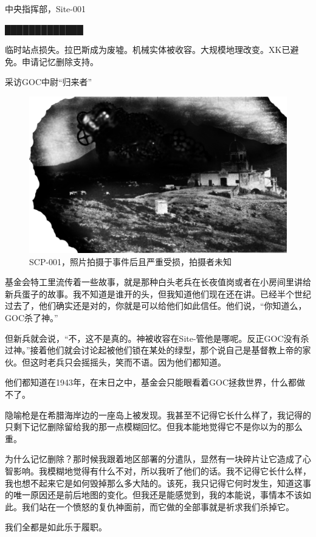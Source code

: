 \begin{scpbox}

中央指挥部，Site-001

█████████████

临时站点损失。拉巴斯成为废墟。机械实体被收容。大规模地理改变。XK已避免。申请记忆删除支持。

\end{scpbox}

采访GOC中尉“归来者” \\

\begin{figure}[H]
	\centering
	\includegraphics[width=0.5\linewidth]{images/SCP.001.the.broken.god.6.png}
	\caption*{SCP-001，照片拍摄于事件后且严重受损，拍摄者未知}
\end{figure}

\begin{scpbox}

基金会特工里流传着一些故事，就是那种白头老兵在长夜值岗或者在小房间里讲给新兵蛋子的故事。我不知道是谁开的头，但我知道他们现在还在讲。已经半个世纪过去了，他们确实还是对的，你就是可以给他们如此信任。他们说，“你知道么，GOC杀了神。”

但新兵就会说，“不，这不是真的。神被收容在Site-管他是哪呢。反正GOC没有杀过神。”接着他们就会讨论起被他们锁在某处的绿型，那个说自己是基督教上帝的家伙。但这时老兵只会摇摇头，笑而不语。因为他们都知道。

他们都知道在1943年，在末日之中，基金会只能眼看着GOC拯救世界，什么都做不了。

隐喻枪是在希腊海岸边的一座岛上被发现。我甚至不记得它长什么样了，我记得的只剩下记忆删除留给我的那一点模糊回忆。但我本能地觉得它不是你以为的那么重。

为什么记忆删除？那时候我跟着地区部署的分遣队，显然有一块碎片让它造成了心智影响。我模糊地觉得有什么不对，所以我听了他们的话。我不记得它长什么样，我也想不起来它是如何毁掉那么多大陆的。该死，我只记得它何时发生，知道这事的唯一原因还是前后地图的变化。但我还是能感觉到，我的本能说，事情本不该如此。我们站在一个愤怒的复仇神面前，而它做的全部事就是祈求我们杀掉它。

我们全都是如此乐于履职。

\end{scpbox}

